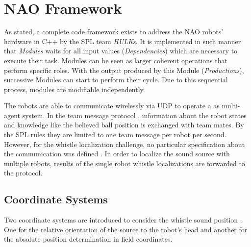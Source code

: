 \section{NAO Framework}
\label{sec:03_naoFramework}

As stated, a complete code framework exists to address the NAO robots' hardware
in C++ by the \ac{SPL} team \textit{HULKs}. 
It is implemented in such manner that \textit{Modules}   waits for all input
values (\textit{Dependencies}) which are necessary to execute their task.
Modules can be seen as larger coherent operations that perform specific roles.
With the output produced by this Module  (\textit{Productions}), successive
Modules can start to perform their cycle.
Due to this sequential process, modules  are modifiable independently. 

The robots are able to communicate wirelessly via \ac{UDP} to operate a as
multi-agent system.
In the team message protocol , information about the robot states and
knowledge like the believed ball position is exchanged with team mates.
By the \ac{SPL} rules \cite{rules} they are limited to one team message per
robot per second.
However, for the whistle localization challenge, no particular specification
about the communication was defined \cite{technical_challenge}.
In order to localize the sound source with multiple robots, results of the
single robot whistle localizations are forwarded to the protocol.

\subsection{Coordinate Systems}
\label{subsec:03_coordinates}

Two coordinate systems are introduced to consider the whistle sound position .
One for the relative orientation of the source to the robot's head and another
for the absolute position determination in field coordinates.

